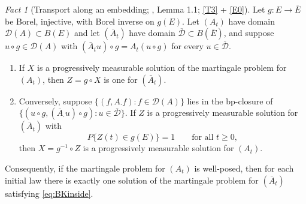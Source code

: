 \documentclass[11pt,a4paper]{article}
\theoremstyle{plain}
\theoremstyle{definition}
\theoremstyle{remark}
\newtheorem{fact}[theorem]{Fact}
\newcommand{\Bdd}{B}                           %
\newcommand{\dom}{\mathcal{D}}                 %
\newcommand{\BK}{\cite{BK93}}
\begin{document}
\begin{fact}[Transport along an embedding; \BK, Lemma 1.1; \eqref{T3} + \eqref{E0}]
  \label{fact:BKtransport}
  Let $g : E \to \bar E$ be Borel, injective, with Borel inverse on $g(E)$.  Let
  $(A_t)$ have domain $\dom(A) \subset \Bdd(E)$ and let $(\bar A_t)$ have domain
  $\overline{\dom} \subset \Bdd(\bar E)$, and suppose $u \circ g \in \dom(A)$ with
  $(\bar A_t u) \circ g = A_t(u \circ g)$ for every $u \in \overline{\dom}$.
  \begin{enumerate}[label=(\alph*)]
  \item If $X$ is a progressively measurable solution of the martingale problem
    for $(A_t)$, then $Z = g \circ X$ is one for $(\bar A_t)$.
  \item Conversely, suppose $\{(f, A_\cdot f) : f \in \dom(A)\}$ lies in the
    bp-closure of $\{(u \circ g, (\bar A_\cdot u) \circ g) : u \in \overline{\dom}\}$.
    If $Z$ is a progressively measurable solution for $(\bar A_t)$ with
    \begin{equation}
      \label{eq:BKinside}
      P\{ Z(t) \in g(E) \} = 1 \qquad \text{for all } t \geq 0 ,
    \end{equation}
    then $X = g^{-1} \circ Z$ is a progressively measurable solution for $(A_t)$.
  \end{enumerate}
  Consequently, if the martingale problem for $(A_t)$ is well-posed, then for each
  initial law there is exactly one solution of the martingale problem for
  $(\bar A_t)$ satisfying \eqref{eq:BKinside}.
\end{fact}
\end{document}
